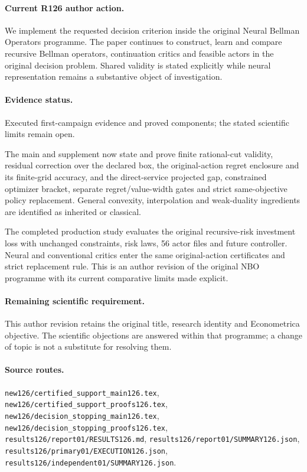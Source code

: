 \paragraph{Current R126 author action.} We implement the requested decision criterion inside the original Neural Bellman Operators programme. The paper continues to construct, learn and compare recursive Bellman operators, continuation critics and feasible actors in the original decision problem. Shared validity is stated explicitly while neural representation remains a substantive object of investigation.

\paragraph{Evidence status.} Executed first-campaign evidence and proved components; the stated scientific limits remain open.

The main and supplement now state and prove finite rational-cut validity, residual correction over the declared box, the original-action regret enclosure and its finite-grid accuracy, and the direct-service projected gap, constrained optimizer bracket, separate regret/value-width gates and strict same-objective policy replacement. General convexity, interpolation and weak-duality ingredients are identified as inherited or classical.\par
The completed production study evaluates the original recursive-risk investment loss with unchanged constraints, risk laws, 56 actor files and future controller. Neural and conventional critics enter the same original-action certificates and strict replacement rule. This is an author revision of the original NBO programme with its current comparative limits made explicit.\par

\paragraph{Remaining scientific requirement.} This author revision retains the original title, research identity and Econometrica objective. The scientific objections are answered within that programme; a change of topic is not a substitute for resolving them.

\paragraph{Source routes.} \nolinkurl{new126/certified_support_main126.tex}, \nolinkurl{new126/certified_support_proofs126.tex}, \nolinkurl{new126/decision_stopping_main126.tex}, \nolinkurl{new126/decision_stopping_proofs126.tex}, \nolinkurl{results126/report01/RESULTS126.md}, \nolinkurl{results126/report01/SUMMARY126.json}, \nolinkurl{results126/primary01/EXECUTION126.json}, \nolinkurl{results126/independent01/SUMMARY126.json}.


